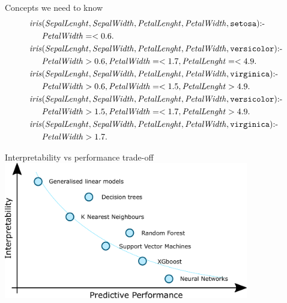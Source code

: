 \documentclass[presentation]{beamer}\mode<presentation>{\usetheme{AMSBolognaFC}}
\begin{document}
\begin{frame}[allowframebreaks]{Concepts we need to know}
    \begin{equation*}
        \begin{aligned}
            \mathit{iris}&(\mathit{SepalLenght}, \mathit{SepalWidth}, \mathit{PetalLenght}, \mathit{PetalWidth}, \mathtt{setosa})\text{:-}\\
            &\mathit{PetalWidth} =< 0.6.\\
            \mathit{iris}&(\mathit{SepalLenght}, \mathit{SepalWidth}, \mathit{PetalLenght}, \mathit{PetalWidth}, \mathtt{versicolor}) \text{:-}\\
            &\mathit{PetalWidth} > 0.6, \mathit{PetalWidth} =< 1.7, \mathit{PetalLenght} =< 4.9.\\
            \mathit{iris}&(\mathit{SepalLenght}, \mathit{SepalWidth}, \mathit{PetalLenght}, \mathit{PetalWidth}, \mathtt{virginica}) \text{:-}\\
            &\mathit{PetalWidth} > 0.6, \mathit{PetalWidth} =< 1.5, \mathit{PetalLenght} > 4.9.\\
            \mathit{iris}&(\mathit{SepalLenght}, \mathit{SepalWidth}, \mathit{PetalLenght}, \mathit{PetalWidth}, \mathtt{versicolor}) \text{:-}\\
            &\mathit{PetalWidth} > 1.5, \mathit{PetalWidth} =< 1.7, \mathit{PetalLenght} > 4.9.\\
            \mathit{iris}&(\mathit{SepalLenght}, \mathit{SepalWidth}, \mathit{PetalLenght}, \mathit{PetalWidth}, \mathtt{virginica}) \text{:-}\\
            &\mathit{PetalWidth} > 1.7.\\
        \end{aligned}
    \end{equation*}
    
    \framebreak
    
    Interpretability vs performance trade-off
    \centering
    \includegraphics[width=0.8\textwidth]{figures/interpretability-performance-tradeoff}
    
\end{frame}
\end{document}
